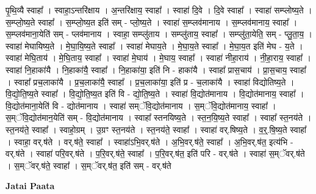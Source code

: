 \documentclass[17pt]{extarticle}
\begin{document}
पृ॒थि॒व्यै स्वाहा᳚ । स्वाहा॒ऽन्तरि॑क्षाय । अ॒न्तरि॑क्षाय॒ स्वाहा᳚ । स्वाहा॑ दि॒वे । दि॒वे स्वाहा᳚ । स्वाहा॑ सम्प्लोष्य॒ते । स॒म्प्लो॒ष्य॒ते स्वाहा᳚ । स॒म्प्लो॒ष्य॒त इति॑ सम् - प्लो॒ष्य॒ते । स्वाहा॑ स॒म्प्लव॑मानाय । स॒म्प्लव॑मानाय॒ स्वाहा᳚ । स॒म्प्लव॑माना॒येति॑ सम् - प्लव॑मानाय । स्वाहा॒ सम्प्लु॑ताय । सम्प्लु॑ताय॒ स्वाहा᳚ । सम्प्लु॑ता॒येति॒ सम् - प्लु॒ता॒य॒ । स्वाहा॑ मेघायिष्य॒ते । मे॒घा॒यि॒ष्य॒ते स्वाहा᳚ । स्वाहा॑ मेघाय॒ते । मे॒घा॒य॒ते स्वाहा᳚ । मे॒घा॒य॒त इति॑ मेघ - य॒ते । स्वाहा॑ मेघि॒ताय॑ । मे॒घि॒ताय॒ स्वाहा᳚ । स्वाहा॑ मे॒घाय॑ । मे॒घाय॒ स्वाहा᳚ । स्वाहा॑ नीहा॒राय॑ । नी॒हा॒राय॒ स्वाहा᳚ । स्वाहा॑ नि॒हाका॑यै । नि॒हाका॑यै॒ स्वाहा᳚ । नि॒हाका॑या॒ इति॑ नि - हाका॑यै । स्वाहा᳚ प्रास॒चाय॑ । प्रा॒स॒चाय॒ स्वाहा᳚ । स्वाहा᳚ प्रच॒लाका॑यै । प्र॒च॒लाका॑यै॒ स्वाहा᳚ । प्र॒च॒लाका॑या॒ इति॑ प्र - च॒लाका॑यै । स्वाहा॑ विद्योतिष्य॒ते । वि॒द्यो॒ति॒ष्य॒ते स्वाहा᳚ । वि॒द्यो॒ति॒ष्य॒त इति॑ वि - द्यो॒ति॒ष्य॒ते । स्वाहा॑ वि॒द्योत॑मानाय । वि॒द्योत॑मानाय॒ स्वाहा᳚ । वि॒द्योत॑माना॒येति॑ वि - द्योत॑मानाय । स्वाहा॑ सम्ॅवि॒द्योत॑मानाय । स॒म्ॅवि॒द्योत॑मानाय॒ स्वाहा᳚ । स॒म्ॅवि॒द्योत॑मान॒येति॑ सम् - वि॒द्योत॑मानाय । स्वाहा᳚ स्तनयिष्य॒ते । स्त॒न॒यि॒ष्य॒ते स्वाहा᳚ । स्वाहा᳚ स्त॒नय॑ते । स्त॒नय॑ते॒ स्वाहा᳚ । स्वाहो॒ग्रम् । उ॒ग्रꣳ स्त॒नय॑ते । स्त॒नय॑ते॒ स्वाहा᳚ । स्वाहा॑ वर्.षिष्य॒ते । व॒र्॒.षि॒ष्य॒ते स्वाहा᳚ । स्वाहा॒ वर्.ष॑ते । वर्.ष॑ते॒ स्वाहा᳚ । स्वाहा॑ऽभि॒वर्.ष॑ते । अ॒भि॒वर्.ष॑ते॒ स्वाहा᳚ । अ॒भि॒वर्.ष॑त॒ इत्य॑भि - वर्.ष॑ते । स्वाहा॑ परि॒वर्.ष॑ते । प॒रि॒वर्.ष॑ते॒ स्वाहा᳚ । प॒रि॒वर्.ष॑त॒ इति॑ परि - वर्.ष॑ते । स्वाहा॑ स॒म्ॅवर्.ष॑ते । स॒म्ॅवर्.ष॑ते॒ स्वाहा᳚ । स॒म्ॅवर्.ष॑त॒ इति॑ सम् - वर्.ष॑ते \newline

\textbf{Jatai Paata} \newline
\end{document}
